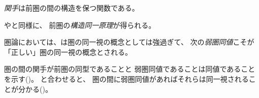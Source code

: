 \documentclass[index]{subfiles}
\begin{document}

\emph{関手}は前圏の間の構造を保つ関数である。





やと同様に、
前圏の\emph{構造同一原理}が得られる。




圏論においては、は圏の同一視の概念としては強過ぎて、
次の\emph{弱圏同値}こそが「正しい」圏の同一視の概念とされる。



圏の間の関手が前圏の同型であることと
弱圏同値であることは同値であることを示す()。
と合わせると、
圏の間に弱圏同値があればそれらは同一視されることが分かる()。







\end{document}

